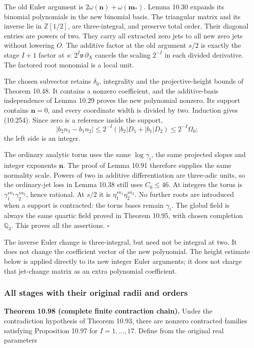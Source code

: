 \documentclass[
  11pt,
  a4paper,
]{article}
\begin{document}
The old Euler argument is
\(2\omega(\boldsymbol n)+\omega(\boldsymbol m_*)\). Lemma 10.30 expands
its binomial polynomials in the new binomial basis. The triangular
matrix and its inverse lie in \(\mathbb Z[1/2]\), are three-integral,
and preserve total order. Their diagonal entries are powers of two. They
carry all extracted zero jets to all new zero jets without lowering
\(O\). The additive factor at the old argument \(s/2\) is exactly the
stage \(I+1\) factor at \(s\): \(2^I\mathfrak v\,\partial_X\) cancels
the scaling \(2^{-I}\) in each divided derivative. The factored root
monomial is a local unit.

The chosen subvector retains \(\delta_0\), integrality and the
projective-height bounds of Theorem 10.48. It contains a nonzero
coefficient, and the additive-basis independence of Lemma 10.29 proves
the new polynomial nonzero. Its support contains \(\boldsymbol n=0\),
and every coordinate width is divided by two. Induction gives (10.254).
Since zero is a reference inside the support, \[
|b_2n_1-b_1n_2|\le
2^{-I}(|b_2|D_1+|b_1|D_2)\le2^{-I}\Omega_0;
\] the left side is an integer.

The ordinary analytic torus uses the same \(\log\gamma_i\), the same
projected slopes and integer exponents \(\boldsymbol n\). The proof of
Lemma 10.91 therefore supplies the same normality scale. Powers of two
in additive differentiation are three-adic units, so the ordinary-jet
loss in Lemma 10.38 still uses \(C_0\le46\). At integers the torus is
\(\gamma_1^{sn_1}\gamma_2^{sn_2}\), hence rational. At \(s/2\) it is
\(\eta_1^{sn_1}\eta_2^{sn_2}\). No further roots are introduced when a
support is contracted: the torus bases remain \(\gamma_i\). The global
field is always the same quartic field proved in Theorem 10.95, with
chosen completion \(\mathbb Q_3\). This proves all the assertions.
\(\square\)

The inverse Euler change is three-integral, but need not be integral at
two. It does not change the coefficient vector of the new polynomial.
The height estimate below is applied directly to its new integer Euler
arguments; it does not charge that jet-change matrix as an extra
polynomial coefficient.

\subsubsection{All stages with their original radii and
orders}\label{all-stages-with-their-original-radii-and-orders}

\textbf{Theorem 10.98 (complete finite contraction chain).} Under the
contradiction hypothesis of Theorem 10.93, there are nonzero contracted
families satisfying Proposition 10.97 for \(I=1,\ldots,17\). Define from
the original real parameters
\end{document}

